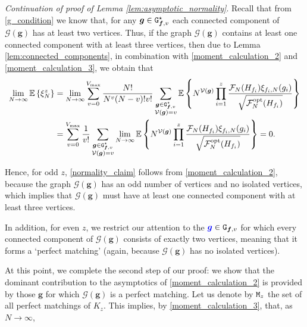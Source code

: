 \documentclass[11pt,reqno]{amsart}
\numberwithin{equation}{section}
\newcommand{\E}[1]{\mathbb{E}\left\{ #1\right\}}
\newcommand{\nelem}[1]{{Lemma \ref{#1}}}
\newcommand{\CNB}[1]{{\color{blue}#1}}
\newcommand{\kb}[1]{\boldsymbol{#1}}
\newcommand{\vk}[1]{\kb{#1}}
\begin{document}
\noindent
{\it Continuation of proof of \nelem{lem:asymptotic_normality}}. Recall that from \eqref{g_condition} we know that, for any $\vk g\in{{\tt G}^{\star}_{\vk f,v}}$ each connected component of $\mathcal{G}(\vk g)$ has at least two vertices. Thus, {if the graph $\mathcal{G}(\vk g)$ contains} at least one connected component with at least three vertices, {then} due to \nelem{lem:connected_components}, in combination with \eqref{moment_calculation_2} and \eqref{moment_calculation_3}, we obtain that
\begin{align*}
    \lim_{N\to\infty} \E{\xi_{{N}}^z} &= \lim_{N\to\infty}\sum_{v=0}^{V_{\max}}\frac{N!}{N^{v}(N-v)!v!}\sum_{\substack{\vk g\in{\tt G}^{\star}_{\vk f,v}\\
     \mathcal{V}\left(\vk g\right) = v }}\E{N^{\mathcal{V}(\vk{g})}\prod_{i=1}^{z}\frac{\mathcal{F}_{{N}}({H}_{f_i})\xi_{f_i,{N}}(g_i)}{\sqrt{\mathcal{F}^{\rm opt}_N({H}_{f_i})}}}\\
     &= \sum_{v=0}^{V_{\max}}\frac{1}{v!}\sum_{\substack{\vk g\in{\tt G}^{\star}_{\vk f,v}\\
     \mathcal{V}\left(\vk g\right) = v }}\lim_{N\to\infty}\E{N^{\mathcal{V}(\vk{g})}\prod_{i=1}^{z}\frac{\mathcal{F}_{{N}}({H}_{f_i})\xi_{f_i,{N}}(g_i)}{\sqrt{\mathcal{F}^{\rm opt}_N({H}_{f_i})}}}=0.
\end{align*}
{Hence, for odd $z$, \eqref{normality_claim} follows from \eqref{moment_calculation_2}, because the graph $\mathcal{G}(\vk g)$ has an odd number of vertices and no isolated vertices, which implies that $\mathcal{G}(\vk g)$ must have at least one connected component with at least three vertices. 

In addition, for even $z$, we restrict our attention to the $\CNB{\vk g} \in {\tt G}_{\vk f,v}$ for which every connected component of $\mathcal{G}(\vk g)$ consists of exactly two vertices, meaning that it forms a {`perfect matching'} (again, because $\mathcal{G}(\vk g)$ has no isolated vertices). 

At this point, we complete the second step of our proof: we show that the dominant contribution to the asymptotics of \eqref{moment_calculation_2} is provided by those $\vk g$ for which $\mathcal{G}(\vk g)$ is a {perfect matching}. Let us denote by ${\tt M}_z$ the set of all perfect matchings of $K_z$. This implies, by \eqref{moment_calculation_3}, that, as $N \to \infty$,} 
\end{document}
